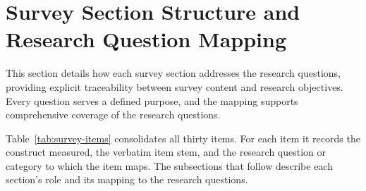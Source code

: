 \section{Survey Section Structure and Research Question Mapping}

This section details how each survey section addresses the research questions, providing explicit traceability between survey content and research objectives. Every question serves a defined purpose, and the mapping supports comprehensive coverage of the research questions.

Table~\ref{tab:survey-items} consolidates all thirty items. For each item it records the construct measured, the verbatim item stem, and the research question or category to which the item maps. The subsections that follow describe each section's role and its mapping to the research questions.

